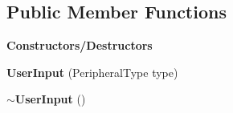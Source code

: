 \subsection*{Public Member Functions}
\begin{Indent}\textbf{ Constructors/\+Destructors}\par
\begin{DoxyCompactItemize}
\item 
\mbox{\label{structrev_1_1_user_input_aebf5941a3de04f706a92d3d6414ef2c3}} 
{\bfseries User\+Input} (Peripheral\+Type type)
\item 
\mbox{\label{structrev_1_1_user_input_a5e929ca3467b45c9995e72d43ebd9da1}} 
{\bfseries $\sim$\+User\+Input} ()
\end{DoxyCompactItemize}
\end{Indent}
